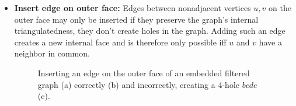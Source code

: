 \begin{itemize}
	\item \textbf{Insert edge on outer face:} Edges between nonadjacent vertices $u, v$ on the outer face may only be inserted if they preserve the graph's internal triangulatedness, \ie{} they don't create holes in the graph. Adding such an edge creates a new internal face and is therefore only possible iff $u$ and $v$ have a neighbor in common.
\begin{figure}[H]
	\centering
	\quad
	\quad
	\caption{Inserting an edge on the outer face of an embedded filtered graph (a) correctly (b) and incorrectly, creating a 4-hole $bcde$ (c).}
	\label{fig:transformation}
\end{figure}


\end{itemize}
